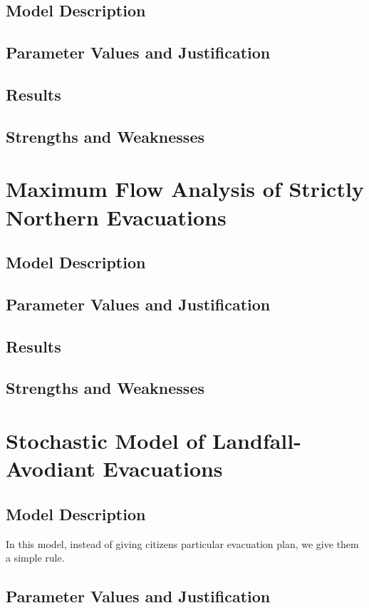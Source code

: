 \documentclass[titlepage]{article}
\begin{document}
  \subsection{Model Description}
  \subsection{Parameter Values and Justification}
  \subsection{Results}
  \subsection{Strengths and Weaknesses}

\section{Maximum Flow Analysis of Strictly Northern Evacuations}
\label{sec:maxflow}
  \subsection{Model Description}
  \subsection{Parameter Values and Justification}
  \subsection{Results}
  \subsection{Strengths and Weaknesses}

\section{Stochastic Model of Landfall-Avodiant Evacuations}
\label{sec:stochastic}
  \subsection{Model Description}
    In this model, instead of giving citizens particular evacuation plan, we give them a simple rule.
  \subsection{Parameter Values and Justification}
\end{document}
